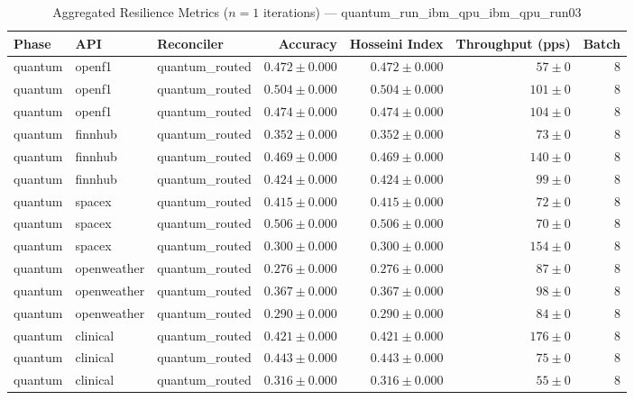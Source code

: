
\begin{table}[htbp]
\caption{Aggregated Resilience Metrics ($n=1$ iterations) --- quantum_run_ibm_qpu_ibm_qpu_run03}
\begin{tabular}{l l l r r r r}
\hline
Phase & API & Reconciler & Accuracy & Hosseini Index & Throughput (pps) & Batch \\
\hline
quantum & openf1 & quantum\_routed & $0.472\pm0.000$ & $0.472\pm0.000$ & $57\pm0$ & 8 \\
quantum & openf1 & quantum\_routed & $0.504\pm0.000$ & $0.504\pm0.000$ & $101\pm0$ & 8 \\
quantum & openf1 & quantum\_routed & $0.474\pm0.000$ & $0.474\pm0.000$ & $104\pm0$ & 8 \\
quantum & finnhub & quantum\_routed & $0.352\pm0.000$ & $0.352\pm0.000$ & $73\pm0$ & 8 \\
quantum & finnhub & quantum\_routed & $0.469\pm0.000$ & $0.469\pm0.000$ & $140\pm0$ & 8 \\
quantum & finnhub & quantum\_routed & $0.424\pm0.000$ & $0.424\pm0.000$ & $99\pm0$ & 8 \\
quantum & spacex & quantum\_routed & $0.415\pm0.000$ & $0.415\pm0.000$ & $72\pm0$ & 8 \\
quantum & spacex & quantum\_routed & $0.506\pm0.000$ & $0.506\pm0.000$ & $70\pm0$ & 8 \\
quantum & spacex & quantum\_routed & $0.300\pm0.000$ & $0.300\pm0.000$ & $154\pm0$ & 8 \\
quantum & openweather & quantum\_routed & $0.276\pm0.000$ & $0.276\pm0.000$ & $87\pm0$ & 8 \\
quantum & openweather & quantum\_routed & $0.367\pm0.000$ & $0.367\pm0.000$ & $98\pm0$ & 8 \\
quantum & openweather & quantum\_routed & $0.290\pm0.000$ & $0.290\pm0.000$ & $84\pm0$ & 8 \\
quantum & clinical & quantum\_routed & $0.421\pm0.000$ & $0.421\pm0.000$ & $176\pm0$ & 8 \\
quantum & clinical & quantum\_routed & $0.443\pm0.000$ & $0.443\pm0.000$ & $75\pm0$ & 8 \\
quantum & clinical & quantum\_routed & $0.316\pm0.000$ & $0.316\pm0.000$ & $55\pm0$ & 8 \\

\end{tabular}
\end{table}
